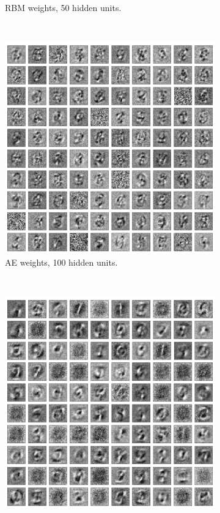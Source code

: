 \documentclass{article}
\begin{document}
\begin{figure}[!ht]
\begin{subfigure}[t]{0.47\textwidth}
    \caption{RBM weights, 50 hidden units.}
    \label{fig:w50rbm}
  \end{subfigure}
  \addtocounter{subfigure}{-2}
  ~
  \begin{subfigure}[t]{0.47\textwidth}
    \centering
    \includegraphics[width=\textwidth]{../plots/3_1_2/ae_last_layer_100_components.png}
    \caption{AE weights, 100 hidden units.}
    \label{fig:w100ae}
  \end{subfigure}
  \addtocounter{subfigure}{1}
  ~
  \begin{subfigure}[t]{0.47\textwidth}
    \centering
    \includegraphics[width=\textwidth]{../plots/3_1_2/rbm_last_layer_100_components.png}

\end{subfigure}
\end{figure}
\end{document}
